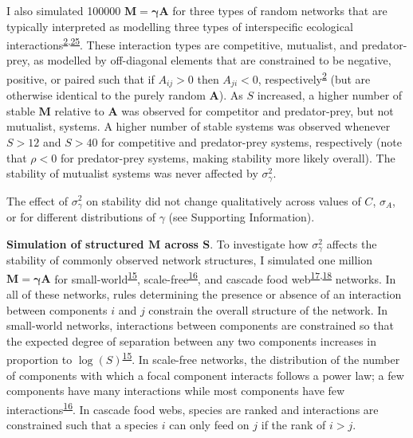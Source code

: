\documentclass[]{article}
\begin{document}
I also simulated 100000 \(\mathbf{M = \gamma A}\) for three types of
random networks that are typically interpreted as modelling three types
of interspecific ecological
interactions\textsuperscript{\protect\hyperlink{ref-Allesina2012}{2},\protect\hyperlink{ref-Allesina2011}{25}}.
These interaction types are competitive, mutualist, and predator-prey,
as modelled by off-diagonal elements that are constrained to be
negative, positive, or paired such that if \(A_{ij} > 0\) then
\(A_{ji} < 0\),
respectively\textsuperscript{\protect\hyperlink{ref-Allesina2012}{2}}
(but are otherwise identical to the purely random \(\mathbf{A}\)). As
\(S\) increased, a higher number of stable \(\mathbf{M}\) relative to
\(\mathbf{A}\) was observed for competitor and predator-prey, but not
mutualist, systems. A higher number of stable systems was observed
whenever \(S > 12\) and \(S > 40\) for competitive and predator-prey
systems, respectively (note that \(\rho < 0\) for predator-prey systems,
making stability more likely overall). The stability of mutualist
systems was never affected by \(\sigma^{2}_{\gamma}\).

The effect of \(\sigma^{2}_{\gamma}\) on stability did not change
qualitatively across values of \(C\), \(\sigma_{A}\), or for different
distributions of \(\gamma\) (see Supporting Information).

\textbf{Simulation of structured \(\mathbf{M}\) across \(\mathbf{S}\)}.
To investigate how \(\sigma^{2}_{\gamma}\) affects the stability of
commonly observed network structures, I simulated one million
\(\mathbf{M = \gamma A}\) for
small-world\textsuperscript{\protect\hyperlink{ref-Watts1998}{15}},
scale-free\textsuperscript{\protect\hyperlink{ref-Albert2002}{16}}, and
cascade food
web\textsuperscript{\protect\hyperlink{ref-Solow1998}{17},\protect\hyperlink{ref-Williams2000}{18}}
networks. In all of these networks, rules determining the presence or
absence of an interaction between components \(i\) and \(j\) constrain
the overall structure of the network. In small-world networks,
interactions between components are constrained so that the expected
degree of separation between any two components increases in proportion
to \(\log(S)\)\textsuperscript{\protect\hyperlink{ref-Watts1998}{15}}.
In scale-free networks, the distribution of the number of components
with which a focal component interacts follows a power law; a few
components have many interactions while most components have few
interactions\textsuperscript{\protect\hyperlink{ref-Albert2002}{16}}. In
cascade food webs, species are ranked and interactions are constrained
such that a species \(i\) can only feed on \(j\) if the rank of
\(i > j\).
\end{document}
